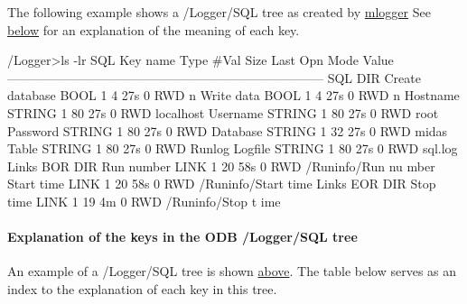 \label{F_mySQL_F_Logger_SQL_tree}
\hypertarget{F_mySQL_F_Logger_SQL_tree}{}
 The following example shows a /Logger/SQL tree as created by \hyperlink{F_Logging_F_mlogger_utility}{mlogger} See \hyperlink{F_mySQL_F_Logger_SQL_keys}{below} for an explanation of the meaning of each key. 
\begin{DoxyCode}
/Logger>ls -lr SQL
Key name                        Type    #Val  Size  Last Opn Mode Value
---------------------------------------------------------------------------
SQL                         DIR
    Create database             BOOL    1     4     27s  0   RWD  n
    Write data                  BOOL    1     4     27s  0   RWD  n
    Hostname                    STRING  1     80    27s  0   RWD  localhost
    Username                    STRING  1     80    27s  0   RWD  root
    Password                    STRING  1     80    27s  0   RWD
    Database                    STRING  1     32    27s  0   RWD  midas
    Table                       STRING  1     80    27s  0   RWD  Runlog
    Logfile                     STRING  1     80    27s  0   RWD  sql.log
    Links BOR                   DIR
        Run number              LINK    1     20    58s  0   RWD  /Runinfo/Run nu
      mber
        Start time              LINK    1     20    58s  0   RWD  /Runinfo/Start 
      time
    Links EOR                   DIR
        Stop time               LINK    1     19    4m   0   RWD  /Runinfo/Stop t
      ime
\end{DoxyCode}
\hypertarget{F_mySQL_F_Logger_SQL_keys}{}\paragraph{Explanation of the keys in the ODB /Logger/SQL tree}\label{F_mySQL_F_Logger_SQL_keys}
An example of a /Logger/SQL tree is shown \hyperlink{F_mySQL_F_Logger_SQL_tree}{above}. The table below serves as an index to the explanation of each key in this tree.

